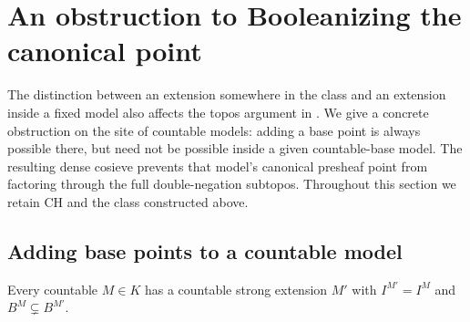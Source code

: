 \section{An obstruction to Booleanizing the canonical point}
\label{sec:booleanization}

The distinction between an extension somewhere in the class and an
extension inside a fixed model also affects the topos argument in
\cite[Theorem~4.1]{Espindola2023Spectra}. We give a concrete obstruction
on the site of countable models: adding a base point is always possible
there, but need not be possible inside a given countable-base model.
The resulting dense cosieve prevents that model's canonical presheaf
point from factoring through the full double-negation subtopos.
Throughout this section we retain CH and the class constructed above.

\subsection{Adding base points to a countable model}

\begin{lemma}\label{bool:extension}
Every countable \(M\in K\) has a countable strong extension \(M'\)
with \(I^{M'}=I^M\) and \(B^M\subsetneq B^{M'}\).
\end{lemma}

